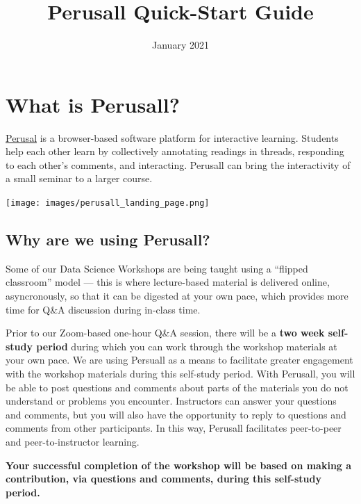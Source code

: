 \documentclass[]{book}
\title{Perusall Quick-Start Guide}
\author{}
\date{\vspace{-2.5em}January 2021}
\begin{document}
\maketitle

{
\setcounter{tocdepth}{1}
\tableofcontents
}
\hypertarget{what-is-perusall}{%
\chapter*{What is Perusall?}\label{what-is-perusall}}

\href{https://perusall.com/}{Perusal} is a browser-based software platform for interactive learning. Students help each other learn by collectively annotating readings in threads, responding to each other's comments, and interacting. Perusall can bring the interactivity of a small seminar to a larger course.

\texttt{[image: images/perusall\_landing\_page.png]}

\hypertarget{why-are-we-using-perusall}{%
\section*{Why are we using Perusall?}\label{why-are-we-using-perusall}}

Some of our Data Science Workshops are being taught using a ``flipped classroom'' model --- this is where lecture-based material is delivered online, asyncronously, so that it can be digested at your own pace, which provides more time for Q\&A discussion during in-class time.

Prior to our Zoom-based one-hour Q\&A session, there will be a \textbf{two week self-study period} during which you can work through the workshop materials at your own pace. We are using Persuall as a means to facilitate greater engagement with the workshop materials during this self-study period. With Perusall, you will be able to post questions and comments about parts of the materials you do not understand or problems you encounter. Instructors can answer your questions and comments, but you will also have the opportunity to reply to questions and comments from other participants. In this way, Perusall facilitates peer-to-peer and peer-to-instructor learning.

\textbf{Your successful completion of the workshop will be based on making a contribution, via questions and comments, during this self-study period.}
\end{document}
